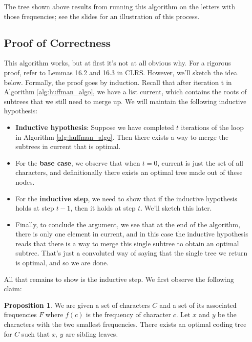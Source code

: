 \documentclass [12pt]{article}
\theoremstyle{definition}
\newtheorem{proposition}{Proposition}
\begin{document}
The tree shown above results from running this algorithm on the letters with those frequencies; see the slides for an illustration of this process.

\subsection{Proof of Correctness}

This algorithm works, but at first it's not at all obvious why. For a rigorous proof, refer to
Lemmas 16.2 and 16.3 in CLRS. However, we'll sketch the idea below. Formally, the proof
goes by induction. Recall that after iteration t in Algorithm \ref{alg:huffman_algo}, we have a list current, which contains the roots of subtrees that we still need to merge up. We will maintain the following inductive hypothesis:

\begin{itemize}
    \item \textbf{Inductive hypothesis}: Suppose we have completed $t$ iterations of the loop in Algorithm \ref{alg:huffman_algo}. Then there exists a way to merge the subtrees in current that is optimal.
    \item For the \textbf{base case}, we observe that when $t = 0$, current is just the set of all characters, and definitionally there exists an optimal tree made out of these nodes.
    \item For the \textbf{inductive step}, we need to show that if the inductive hypothesis holds at step $t - 1$, then it holds at step $t$. We'll sketch this later.
    \item Finally, to conclude the argument, we see that at the end of the algorithm, there is only one element in current, and in this case the inductive hypothesis reads that there is a way to merge this single subtree to obtain an optimal subtree. That's just a convoluted way of saying that the single tree we return is optimal, and so we are done.
\end{itemize}
All that remains to show is the inductive step. We first observe the following claim:

\begin{proposition}
We are given a set of characters $C$ and a set of its associated frequencies $F$ where $f (c)$ is the frequency of character $c$. Let $x$ and $y$ be the characters with the two smallest frequencies. There exists an optimal coding tree for $C$ such that $x$, $y$ are sibling leaves.
\end{proposition}
\end{document}
